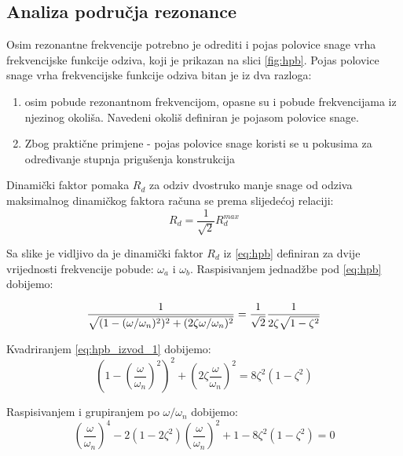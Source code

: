 \subsection{Analiza područja rezonance}
Osim rezonantne frekvencije potrebno je odrediti i pojas polovice snage vrha
frekvencijske funkcije odziva, koji je prikazan na slici \ref{fig:hpb}. Pojas polovice
snage vrha frekvencijske funkcije odziva bitan je iz dva razloga:
\begin{enumerate}
    \item osim pobude rezonantnom frekvencijom, opasne su i pobude frekvencijama iz
        njezinog okoliša. Navedeni okoliš definiran je pojasom polovice snage.
    \item Zbog praktične primjene - pojas polovice snage koristi se u pokusima
        za određivanje stupnja prigušenja konstrukcija
\end{enumerate}

Dinamički faktor pomaka $R_d$ za odziv dvostruko manje snage od odziva maksimalnog
dinamičkog faktora računa se prema slijedećoj relaciji:
\begin{equation}\label{eq:hpb}
    R_d = \frac{1}{\sqrt{2}}R_d^{max}
\end{equation}

Sa slike je vidljivo da je dinamički faktor $R_d$ iz \eqref{eq:hpb} definiran za
dvije vrijednosti frekvencije pobude: $\omega_a$ i $\omega_b$. Raspisivanjem
jednadžbe pod \eqref{eq:hpb} dobijemo:

\begin{equation}\label{eq:hpb_izvod_1}
        \frac{1}{\sqrt{(1-(\omega/\omega_n)^2)^2+(2\zeta\omega/\omega_n)^2}}=
            \frac{1}{\sqrt{2}}\frac{1}{2\zeta\sqrt{1-\zeta^2}}\\
\end{equation}

Kvadriranjem \eqref{eq:hpb_izvod_1} dobijemo:
\begin{equation}\label{eq:hpb_izvod_2}
    \left(1-\left(\frac{\omega}{\omega_n}\right)^2\right)^2
    +\left(2\zeta\frac{\omega}{\omega_n}\right)^2 =
    8\zeta^2(1-\zeta^2)
\end{equation}

Raspisivanjem i grupiranjem po $\omega/\omega_n$ dobijemo:
\begin{equation}\label{eq:hpb_izvod_3}
    \left(\frac{\omega}{\omega_n}\right)^4
    -2(1-2\zeta^2)\left(\frac{\omega}{\omega_n}\right)^2
    +1-8\zeta^2(1-\zeta^2)=0
\end{equation}

